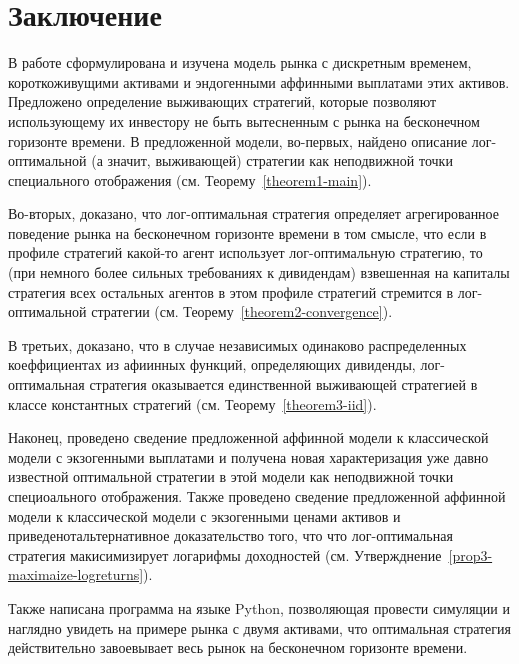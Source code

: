 \documentclass[a4paper,12pt,russian]{article} %
\theoremstyle{definition}
\begin{document}
\section{Заключение}
\label{section7-conclusion}

В работе сформулирована  и изучена модель рынка с дискретным временем, короткоживущими активами и эндогенными аффинными выплатами этих активов. Предложено определение выживающих стратегий, которые позволяют использующему их инвестору не быть вытесненным с рынка на бесконечном горизонте времени. 
В предложенной  модели, во-первых, найдено описание лог-оптимальной (а значит, выживающей) стратегии как неподвижной точки специального отображения (см. Теорему~\ref{theorem1-main}). 

Во-вторых, доказано, что лог-оптимальная стратегия определяет агрегированное поведение рынка на бесконечном горизонте времени в том смысле, что если в профиле стратегий какой-то агент использует лог-оптимальную стратегию, то (при немного более сильных требованиях к дивидендам) взвешенная на капиталы стратегия всех остальных агентов в этом профиле стратегий стремится в лог-оптимальной стратегии (см. Теорему~\ref{theorem2-convergence}).

 В третьих, доказано, что в случае независимых одинаково распределенных коеффициентах из афиинных функций, определяющих дивиденды, лог-оптимальная стратегия оказывается единственной выживающей стратегией в классе константных стратегий (см. Теорему~\ref{theorem3-iid}).

 Наконец, проведено сведение предложенной аффинной модели к классической модели с экзогенными выплатами и получена новая характеризация уже давно известной оптимальной стратегии в этой модели как неподвижной точки специоального отображения. Также проведено сведение предложенной аффинной модели к классической модели с экзогенными ценами активов и приведенотальтернативное доказательство того, что что лог-оптимальная стратегия макисимизирует логарифмы доходностей (см. Утвержднение~\ref{prop3-maximaize-logreturns}).

 Также написана программа на языке Python, позволяющая провести симуляции и наглядно увидеть на примере рынка с двумя активами, что оптимальная стратегия действительно завоевывает весь рынок на бесконечном горизонте времени.

 
\end{document}
